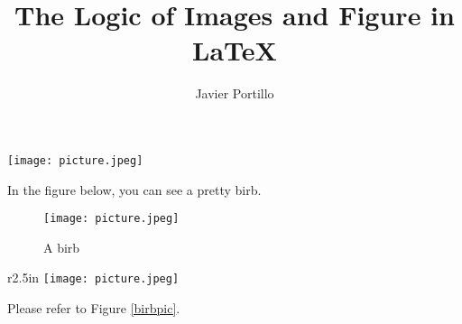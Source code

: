 \documentclass{article}
\author{Javier Portillo}
\title{The Logic of Images and Figure in {\LaTeX}}
\begin{document}
\maketitle

\begin{center}
	\texttt{[image: picture.jpeg]}
\end{center}

\blindtext

\blindtext

In the figure below, you can see a pretty birb.

\begin{figure}[h]
  \centering
  \texttt{[image: picture.jpeg]}
  \caption{A birb}
\end{figure}

\blindtext
\blindtext
\blindtext

\begin{wrapfigure}{r}{2.5in}
  \centering
	\texttt{[image: picture.jpeg]}
  \caption{another same birb}
  \label{birbpic}
\end{wrapfigure}

Please refer to Figure \ref{birbpic}.

\blindtext
\blindtext
\end{document}
